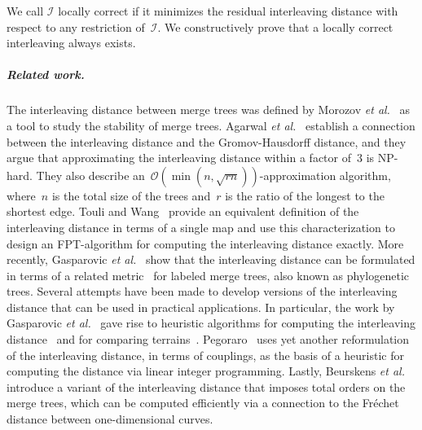 \documentclass[11pt]{article}
\newcommand{\etal}{\emph{et al.}}
\newcommand{\bigO}{\mathcal{O}}
\newcommand{\I}{\mathcal{I}}
\begin{document}
We call $\I$ locally correct if it minimizes the residual interleaving distance with respect to any restriction of~$\I$.
We constructively prove that a locally correct interleaving always exists.
%
\subparagraph{Related work.}
The interleaving distance between merge trees was defined by Morozov \etal~\cite{morozov2013interleaving} as a tool to study the stability of merge trees.
Agarwal \etal~\cite{agarwal2018computing} establish a connection between the interleaving distance and the Gromov-Hausdorff distance, and they argue that approximating the interleaving distance within a factor of~$3$ is NP-hard.
They also describe an~$\bigO(\min(n, \sqrt{rn}))$-approximation algorithm, where~$n$ is the total size of the trees and~$r$ is the ratio of the longest to the shortest edge.
Touli and Wang~\cite{touli2022fpt} provide an equivalent definition of the interleaving distance in terms of a single map and use this characterization to design an FPT-algorithm for computing the interleaving distance exactly.
More recently, Gasparovic \etal~\cite{gasparovic2024intrinsic} show that the interleaving distance can be formulated in terms of a related metric~\cite{munch2019the} for labeled merge trees, also known as phylogenetic trees.
%
Several attempts have been made to develop versions of the interleaving distance that can be used in practical applications.
In particular, the work by Gasparovic \etal~\cite{gasparovic2024intrinsic} gave rise to heuristic algorithms for computing the interleaving distance~\cite{curry2022decorated} and for comparing terrains~\cite{yan2022geometry, yan2020structural}.
Pegoraro~\cite{pegoraro2025graph-matching} uses yet another reformulation of the interleaving distance, in terms of couplings, as the basis of a heuristic for computing the distance via linear integer programming.
Lastly, Beurskens \etal~\cite{beurskens2025relating} introduce a variant of the interleaving distance that imposes total orders on the merge trees, which can be computed efficiently via a connection to the Fréchet distance between one-dimensional curves.
%
\end{document}
